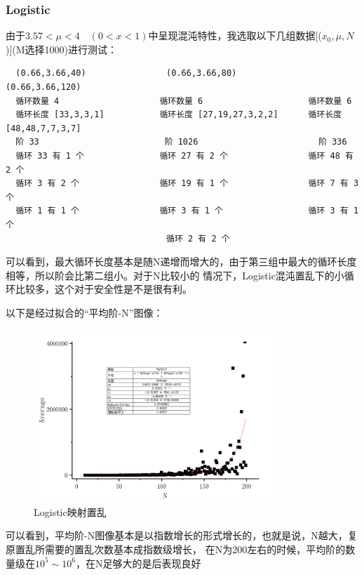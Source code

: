 \documentclass[a4paper]{article}
\begin{document}
\subsubsection{Logistic}
由于$3.57<\mu<4 \quad (0<x<1)$中呈现混沌特性，我选取以下几组数据[($x_0,\mu,N$)](M选择1000)进行测试：
\begin{lstlisting}
  (0.66,3.66,40)                (0.66,3.66,80)                 (0.66,3.66,120)
  循环数量 4                    循环数量 6                     循环数量 6
  循环长度 [33,3,3,1]           循环长度 [27,19,27,3,2,2]      循环长度 [48,48,7,7,3,7]
  阶 33                         阶 1026                        阶 336
  循环 33 有 1 个               循环 27 有 2 个                循环 48 有 2 个
  循环 3 有 2 个                循环 19 有 1 个                循环 7 有 3 个
  循环 1 有 1 个                循环 3 有 1 个                 循环 3 有 1 个
                                循环 2 有 2 个
\end{lstlisting}
可以看到，最大循环长度基本是随N递增而增大的，由于第三组中最大的循环长度相等，所以阶会比第二组小。对于N比较小的
情况下，Logistic混沌置乱下的小循环比较多，这个对于安全性是不是很有利。\par
\newpage
以下是经过拟合的“平均阶-N”图像：
\begin{figure}[H]
  \centering
  \includegraphics[width=0.8\textwidth]{imgs/logistic.png}
  \caption{Logistic映射置乱}
  \label{Logistic}
\end{figure}
可以看到，平均阶-N图像基本是以指数增长的形式增长的，也就是说，N越大，复原置乱所需要的置乱次数基本成指数级增长，
在N为200左右的时候，平均阶的数量级在$10^5\sim 10^6$，在N足够大的是后表现良好
\end{document}
